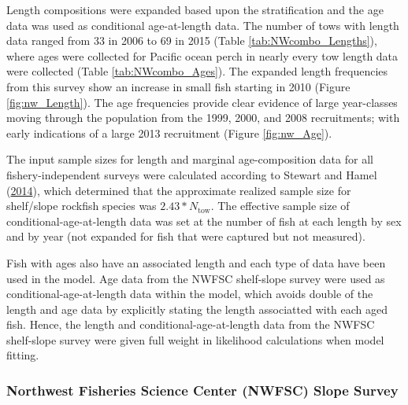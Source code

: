 \documentclass[12pt,]{article}
\begin{document}
Length compositions were expanded based upon the stratification and the
age data was used as conditional age-at-length data. The number of tows
with length data ranged from 33 in 2006 to 69 in 2015 (Table
\ref{tab:NWcombo_Lengths}), where ages were collected for Pacific ocean
perch in nearly every tow length data were collected (Table
\ref{tab:NWcombo_Ages}). The expanded length frequencies from this
survey show an increase in small fish starting in 2010 (Figure
\ref{fig:nw_Length}). The age frequencies provide clear evidence of
large year-classes moving through the population from the 1999, 2000,
and 2008 recruitments; with early indications of a large 2013
recruitment (Figure \ref{fig:nw_Age}).

The input sample sizes for length and marginal age-composition data for
all fishery-independent surveys were calculated according to Stewart and
Hamel (\protect\hyperlink{ref-stewart_bootstrapping_2014}{2014}), which
determined that the approximate realized sample size for shelf/slope
rockfish species was \(2.43*N_{\text{tow}}\). The effective sample size
of conditional-age-at-length data was set at the number of fish at each
length by sex and by year (not expanded for fish that were captured but
not measured).

Fish with ages also have an associated length and each type of data have
been used in the model. Age data from the NWFSC shelf-slope survey were
used as conditional-age-at-length data within the model, which avoids
double of the length and age data by explicitly stating the length
associatted with each aged fish. Hence, the length and
conditional-age-at-length data from the NWFSC shelf-slope survey were
given full weight in likelihood calculations when model fitting.

\subsubsection{Northwest Fisheries Science Center (NWFSC) Slope
Survey}\label{northwest-fisheries-science-center-nwfsc-slope-survey}
\end{document}

